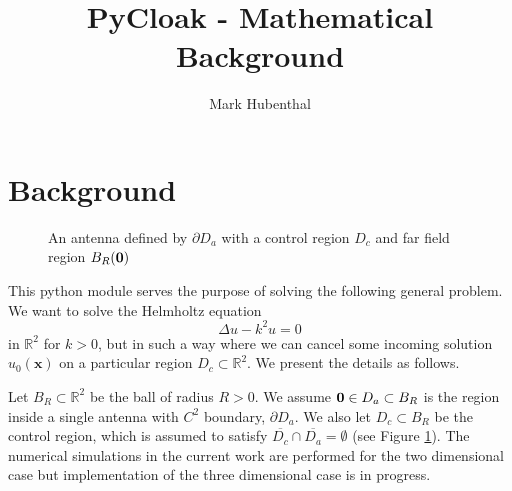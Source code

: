 \documentclass[11pt]{amsart}
\title{PyCloak - Mathematical Background}
\date{}
\author[Mark Hubenthal]{Mark Hubenthal}
\theoremstyle{definition}
\theoremstyle{definition}
\theoremstyle{definition}
\def\B0{{\bf 0}}
\begin{document}
\maketitle

\section{Background}
\label{sec:background}
\begin{figure}
\centering
\def \svgwidth{0.4\linewidth}

\caption{An antenna defined by $\partial D_{a}$ with a control region $D_{c}$ and far field region $B_R(\B0)$ }\label{fig:mainsetup}
\end{figure}
This python module serves the purpose of solving the following general problem. We want to solve the Helmholtz equation
\begin{equation*}
\Delta u - k^{2} u = 0
\end{equation*}
in $\mathbb{R}^{2}$ for $k > 0$, but in such a way where we can cancel some incoming solution $u_{0}(\mathbf{x})$ on a particular region $D_{c} \subset \mathbb{R}^{2}$. We present the details as follows.

Let $B_{R} \subset \mathbb{R}^{2}$ be the ball of radius $R > 0$. We assume $\B0\in D_{a} \subset  B_{R}$ is the region inside a single antenna with $C^{2}$ boundary, $\partial D_{a}$. We also let $D_{c} \subset B_{R}$ be the control region, which is assumed to satisfy $\overline{D_{c}} \cap \overline{D_{a}} = \emptyset$ (see Figure \ref{fig:mainsetup}). The numerical simulations in the current work are performed for the two dimensional case but implementation of the three dimensional case is in progress.
\end{document}
